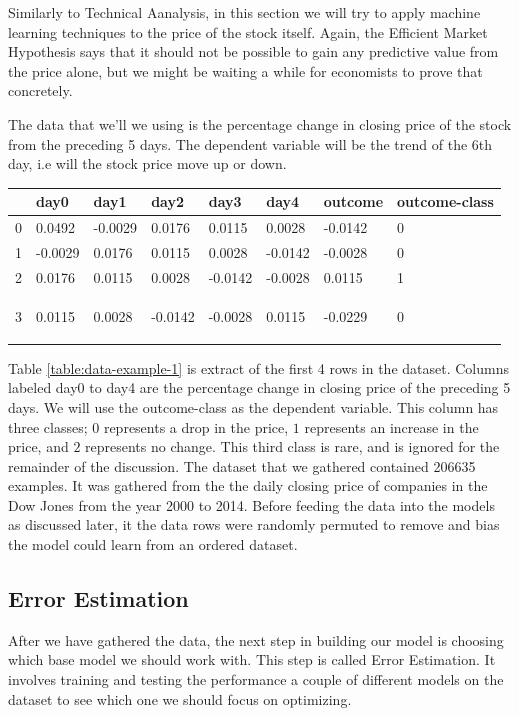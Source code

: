 \documentclass{report}
\begin{document}
Similarly to Technical Aanalysis, in this section we will try to apply machine learning techniques to the price of the stock itself. Again, the Efficient Market Hypothesis says that it should not be possible to gain any predictive value from the price alone, but we might be waiting a while for economists to prove that concretely.

The data that we'll we using is the percentage change in closing price of the stock from the preceding 5 days. The dependent variable will be the trend of the 6th day, i.e will the stock price move up or down.

\begin{center}
    \begin{tabular}{l | l | l | l | l | l | l | l}
	& day0 & day1 &	day2 & day3 & day4 & outcome & outcome-class \\ \hline
0	& 0.0492 &	-0.0029 &	0.0176 &	0.0115 &	0.0028 &	-0.0142 &	0\\ \hline
1	& -0.0029 &	0.0176 &	0.0115 &	0.0028 & -0.0142 &	-0.0028 &	0\\ \hline
2	& 0.0176 &	0.0115 &	0.0028 &	-0.0142 & -0.0028 &	0.0115 &	1\\ \hline
3	& 0.0115 &	0.0028 &	-0.0142 &	-0.0028 &	0.0115 &	-0.0229 &	0

    \label{table:data-example-1}
    \end{tabular}
\end{center}

Table \ref{table:data-example-1} is extract of the first 4 rows in the dataset. Columns labeled day0 to day4 are the percentage change in closing price of the preceding 5 days. We will use the outcome-class as the dependent variable. This column has three classes; $0$ represents a drop in the price, $1$ represents an increase in the price, and $2$ represents no change. This third class is rare, and is ignored for the remainder of the discussion. The dataset that we gathered contained 206635 examples. It was gathered from the the daily closing price of companies in the Dow Jones from the year 2000 to 2014. Before feeding the data into the models as discussed later, it the data rows were randomly permuted to remove and bias the model could learn from an ordered dataset.

\subsection{Error Estimation}

After we have gathered the data, the next step in building our model is choosing which base model we should work with. This step is called Error Estimation. It involves training and testing the performance a couple of different models on the dataset to see which one we should focus on optimizing.
\end{document}
